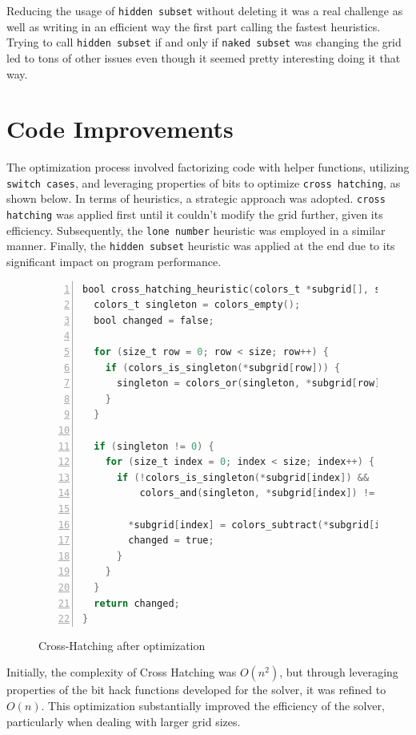 \documentclass[a4paper, 11pt]{article}
\begin{document}
Reducing the usage of \texttt{hidden subset} without deleting it was a real challenge as well as writing in an efficient way the first part calling the fastest heuristics. Trying to call \texttt{hidden subset} if and only if \texttt{naked subset} was changing the grid led to tons of other issues even though it seemed pretty interesting doing it that way. 

\newpage

\section{Code Improvements}
\par The optimization process involved factorizing code with helper functions, utilizing \texttt{switch cases}, and leveraging properties of bits to optimize \texttt{cross hatching}, as shown below. In terms of heuristics, a strategic approach was adopted. \texttt{cross hatching} was applied first until it couldn't modify the grid further, given its efficiency. Subsequently, the \texttt{lone number} heuristic was employed in a similar manner. Finally, the \texttt{hidden subset} heuristic was applied at the end due to its significant impact on program performance.

\begin{figure}[h]
\begin{lstlisting}[language=C,frame = single, numbers = left]
 bool cross_hatching_heuristic(colors_t *subgrid[], size_t size) {
  colors_t singleton = colors_empty();
  bool changed = false;

  for (size_t row = 0; row < size; row++) {
    if (colors_is_singleton(*subgrid[row])) {
      singleton = colors_or(singleton, *subgrid[row]);
    }
  }

  if (singleton != 0) {
    for (size_t index = 0; index < size; index++) {
      if (!colors_is_singleton(*subgrid[index]) &&
          colors_and(singleton, *subgrid[index]) != 0) {

        *subgrid[index] = colors_subtract(*subgrid[index], singleton);
        changed = true;
      }
    }
  }
  return changed;
}
\end{lstlisting}
\caption{Cross-Hatching after optimization}
\end{figure}

\par Initially, the complexity of Cross Hatching was \(O(n^2)\), but through leveraging properties of the bit hack functions developed for the solver, it was refined to \(O(n)\). This optimization substantially improved the efficiency of the solver, particularly when dealing with larger grid sizes.
 
\end{document}
